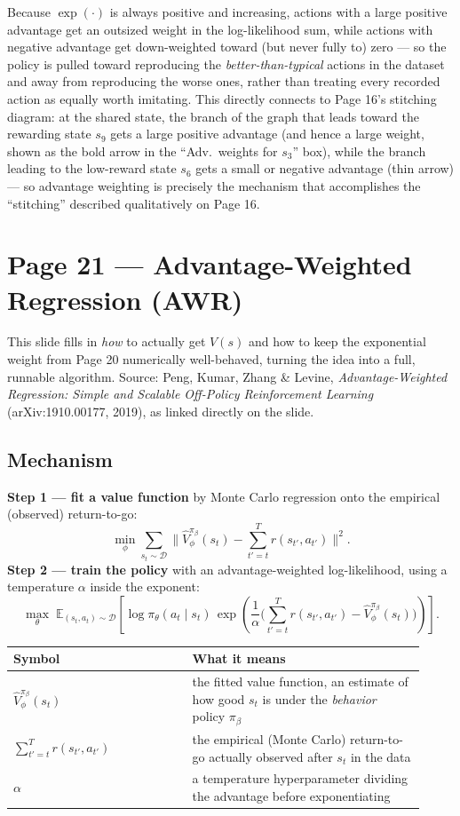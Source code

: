 \documentclass[11pt]{article}
\begin{document}
Because $\exp(\cdot)$ is always positive and increasing, actions with a large positive advantage get an outsized weight in the log-likelihood sum, while actions with negative advantage get down-weighted toward (but never fully to) zero --- so the policy is pulled toward reproducing the \emph{better-than-typical} actions in the dataset and away from reproducing the worse ones, rather than treating every recorded action as equally worth imitating. This directly connects to Page 16's stitching diagram: at the shared state, the branch of the graph that leads toward the rewarding state $s_9$ gets a large positive advantage (and hence a large weight, shown as the bold arrow in the ``Adv.\ weights for $s_3$'' box), while the branch leading to the low-reward state $s_6$ gets a small or negative advantage (thin arrow) --- so advantage weighting is precisely the mechanism that accomplishes the ``stitching'' described qualitatively on Page 16.

\section*{Page 21 --- Advantage-Weighted Regression (AWR)}

This slide fills in \emph{how} to actually get $V(s)$ and how to keep the exponential weight from Page 20 numerically well-behaved, turning the idea into a full, runnable algorithm. Source: Peng, Kumar, Zhang \& Levine, \emph{Advantage-Weighted Regression: Simple and Scalable Off-Policy Reinforcement Learning} (arXiv:1910.00177, 2019), as linked directly on the slide.

\subsection*{Mechanism}

\textbf{Step 1 --- fit a value function} by Monte Carlo regression onto the empirical (observed) return-to-go:
\[
\min_\phi \sum_{s_t\sim\mathcal{D}} \Big\lVert \hat V^{\pi_\beta}_\phi(s_t) - \sum_{t'=t}^{T} r(s_{t'},a_{t'})\Big\rVert^2.
\]
\textbf{Step 2 --- train the policy} with an advantage-weighted log-likelihood, using a temperature $\alpha$ inside the exponent:
\[
\max_\theta\; \mathbb{E}_{(s_t,a_t)\sim\mathcal{D}}\left[\log \pi_\theta(a_t\mid s_t)\, \exp\!\left(\frac{1}{\alpha}\Big(\sum_{t'=t}^{T} r(s_{t'},a_{t'}) - \hat V^{\pi_\beta}_\phi(s_t)\Big)\right)\right].
\]

\begin{center}
\begin{tabular}{@{}p{0.4\linewidth}p{0.52\linewidth}@{}}
\toprule
Symbol & What it means \\
\midrule
$\hat V^{\pi_\beta}_\phi(s_t)$ & the fitted value function, an estimate of how good $s_t$ is under the \emph{behavior} policy $\pi_\beta$ \\
$\sum_{t'=t}^T r(s_{t'},a_{t'})$ & the empirical (Monte Carlo) return-to-go actually observed after $s_t$ in the data \\
$\alpha$ & a temperature hyperparameter dividing the advantage before exponentiating \\
\bottomrule
\end{tabular}
\end{center}
\end{document}
